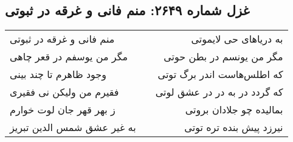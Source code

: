 \begin{center}
\section*{غزل شماره ۲۶۴۹: منم فانی و غرقه در ثبوتی}
\label{sec:2649}
\begin{longtable}{l p{0.5cm} r}
منم فانی و غرقه در ثبوتی
&&
به دریاهای حی لایموتی
\\
مگر من یوسفم در قعر چاهی
&&
مگر من یونسم در بطن حوتی
\\
وجود ظاهرم تا چند بینی
&&
که اطلس‌هاست اندر برگ توتی
\\
فقیرم من ولیکن نی فقیری
&&
که گردد در به در در عشق لوتی
\\
ز بهر قهر جان لوت خوارم
&&
بمالیده چو جلادان بروتی
\\
به غیر عشق شمس الدین تبریز
&&
نیرزد پیش بنده تره توتی
\\
\end{longtable}
\end{center}
